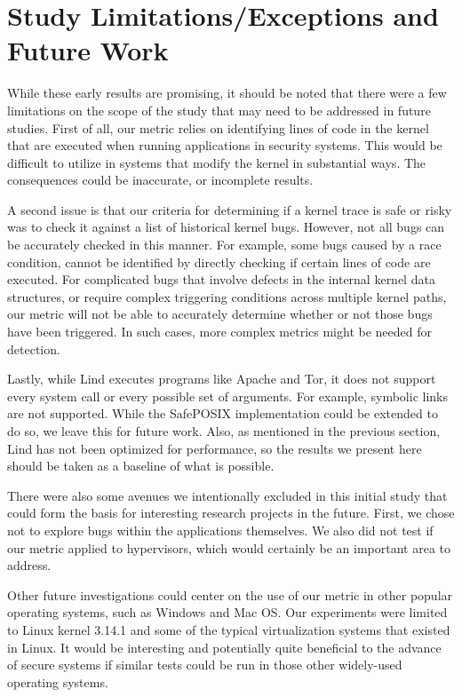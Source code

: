 \section{Study Limitations/Exceptions and Future Work}
\label{sec.limitation}

While these early results are promising, 
it should be noted that there were a few limitations on the scope 
of the study that may need to be addressed in future studies. 
First of all, our metric relies on identifying lines of code in the kernel that 
are executed when running applications in security systems. 
This would be difficult to utilize in systems that modify the kernel in substantial ways. 
The consequences could be inaccurate, or incomplete results. 

A second issue is that our criteria for determining if a kernel trace is safe or risky 
was to check it against a list of historical kernel bugs. However, not all bugs can be 
accurately checked in this manner. For example, some bugs caused by a race condition, 
cannot be identified by directly checking if certain lines of code are executed. 
For complicated bugs that involve defects in the internal kernel data structures, 
or require complex triggering conditions across multiple kernel paths, our metric 
will not be able to accurately determine whether or not those bugs have been triggered. 
In such cases, more complex metrics might be needed for detection.  

Lastly, while Lind executes programs like Apache and Tor, 
it does not support every system call or every possible set of arguments. 
For example,  symbolic links are not supported.  While the SafePOSIX implementation 
could be extended to do so, we leave this for future work. 
Also, as mentioned in the previous section, Lind has not been optimized for performance, 
so the results we present here should be taken as a baseline of what is possible.

There were also some avenues we intentionally excluded in this initial study that could form 
the basis for interesting research projects in the future. First, we chose not to explore bugs 
within the applications themselves.  We also did not test if our metric applied to hypervisors, 
which would certainly be an important area to address. 

Other future investigations could center on the use of our metric in other popular operating systems, 
such as Windows and Mac OS. Our experiments were limited to Linux kernel 3.14.1 
and some of the typical virtualization systems that existed in Linux. 
It would be interesting and potentially quite beneficial to the advance of secure systems 
if similar tests could be run in those other widely-used operating systems. 